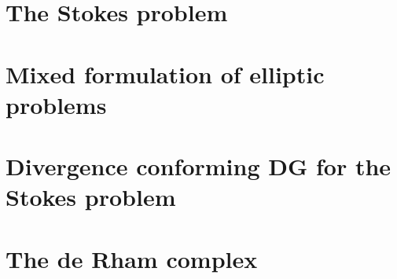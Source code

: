 \chapter{The Stokes problem}
\label{cha:stokes}


\chapter{Mixed formulation of elliptic problems}
\label{cha:darcy}


\chapter{Divergence conforming DG for the Stokes problem}
\label{cha:hdivdg}


\chapter{The de Rham complex}
\label{cha:derham}


\printbibliography
\printindex


